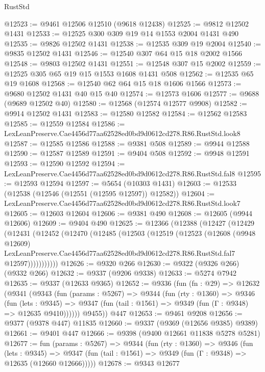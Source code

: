 \begin{lexlean}{RustStd}
\begin{coremodule}
@12523 := @9461 @12506 @12510 (@9618 @12438)
@12525 := @9812 @12502 @1431
@12533 := @12525 @300 @309 @19 @14 @1553 @2004 @1431 @490
@12535 := @9826 @12502 @1431
@12538 := @12535 @309 @19 @2004
@12540 := @9835 @12502 @1431
@12546 := @12540 @307 @64 @15 @18 @2002 @1566
@12548 := @9803 @12502 @1431
@12551 := @12548 @307 @15 @2002
@12559 := @12525 @305 @65 @19 @15 @1553 @1608 @1431 @508
@12562 := @12535 @65 @19 @1608
@12568 := @12540 @62 @64 @15 @18 @1606 @1566
@12573 := @9680 @12502 @1431 @40 @15 @40
@12574 := @12573 @1606
@12577 := @9688 (@9689 @12502 @40)
@12580 := @12568 (@12574 @12577 @9908)
@12582 := @9914 @12502 @1431
@12583 := @12580 @12582
@12584 := @12562 @12583
@12585 := @12559 @12584
@12586 := LexLeanPreserve.Cae4456d77aa62528ed0bd9d0612cd278.R86.RustStd.look8
@12587 := @12585 @12586
@12588 := @9381 @508
@12589 := @9944 @12588
@12590 := @12587 @12589
@12591 := @9404 @508
@12592 := @9948 @12591
@12593 := @12590 @12592
@12594 := LexLeanPreserve.Cae4456d77aa62528ed0bd9d0612cd278.R86.RustStd.fal8
@12595 := @12593 @12594
@12597 := @5654 (@10303 @1431)
@12603 := @12533 (@12538 (@12546 (@12551 (@12595 @12597)) @12582))
@12604 := LexLeanPreserve.Cae4456d77aa62528ed0bd9d0612cd278.R86.RustStd.look7
@12605 := @12603 @12604
@12606 := @9381 @490
@12608 := @12605 (@9944 @12606)
@12609 := @9404 @490
@12625 := @12366
    (@12388
      (@12427
        (@12429
          (@12431
            (@12452
              (@12470
                (@12485
                  (@12503
                    (@12519
                      (@12523
                        (@12608
                          (@9948 @12609)
                          LexLeanPreserve.Cae4456d77aa62528ed0bd9d0612cd278.R86.RustStd.fal7
                          @12597)))))))))))
@12626 := @9320 @266
@12630 := @9322 (@9326 @266) (@9332 @266)
@12632 := @9337 (@9206 @9338)
@12633 := @5274 @7942
@12635 := @9337 (@12633 @9365)
@12652 := @9336
    (fun (fn : @29) =>
    @12632
      (@9341
        (@9343
          (fun (params : @5267) =>
          @9344
            (fun (rty : @1360) =>
            @9346
              (fun (lets : @9345) =>
              @9347 (fun (tail : @1561) => @9349 (fun (Γ : @9348) => @12635 @9410))))))
        @9455))
    @447
@12653 := @9461 @9208
@12656 := @9377 (@9378 @447) @11835
@12660 := @9337 (@9369 (@12656 @9385) @9389)
@12661 := @9401 @447
@12666 := @9398 (@9400 @12661 @11838 @5278 @5281)
@12677 := fun (params : @5267) =>
  @9344
    (fun (rty : @1360) =>
    @9346
      (fun (lets : @9345) =>
      @9347 (fun (tail : @1561) => @9349 (fun (Γ : @9348) => @12635 (@12660 @12666)))))
@12678 := @9343 @12677

\end{coremodule}
\end{lexlean}
